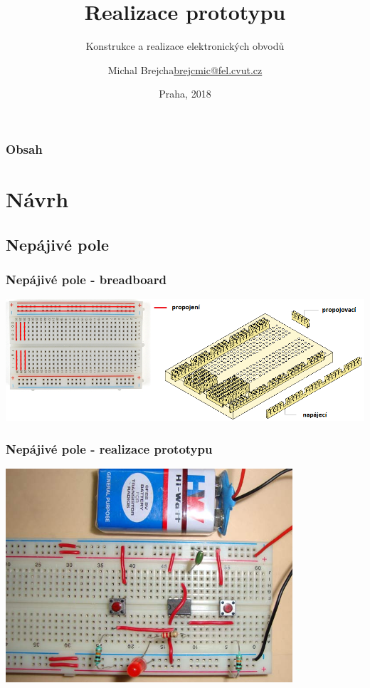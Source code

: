 \documentclass{beamer}
\title[Realizace prototypu]{Realizace prototypu}
\subtitle[KEO] {Konstrukce a realizace elektronických obvodů}
\author[Brejcha]{\texorpdfstring{Michal Brejcha\newline\url{brejcmic@fel.cvut.cz}}{Michal Brejcha}}
\institute[ČVUT]{ČVUT v Praze, FEL}
\date[Praha, 2018]{Praha, 2018}
\begin{document}
\frame{\titlepage}

\begin{frame}
\frametitle{Obsah} 
\tableofcontents
\end{frame}


\section{\texorpdfstring{Návrh}{Navrh}}
\subsection{\texorpdfstring{Nepájivé pole}{Nepajive pole}}
  \begin{frame}
    \frametitle{Nepájivé pole - breadboard}
    \begin{center}
      \includegraphics[width=\textwidth]{obr/breadBoard_bot.png}
    \end{center}
  \end{frame}
  \begin{frame}
    \frametitle{Nepájivé pole - realizace prototypu}
    \begin{center}
      \includegraphics[width=0.8\textwidth]{obr/breadBoard_prot.png}
    \end{center}
  \end{frame}
\end{document}
